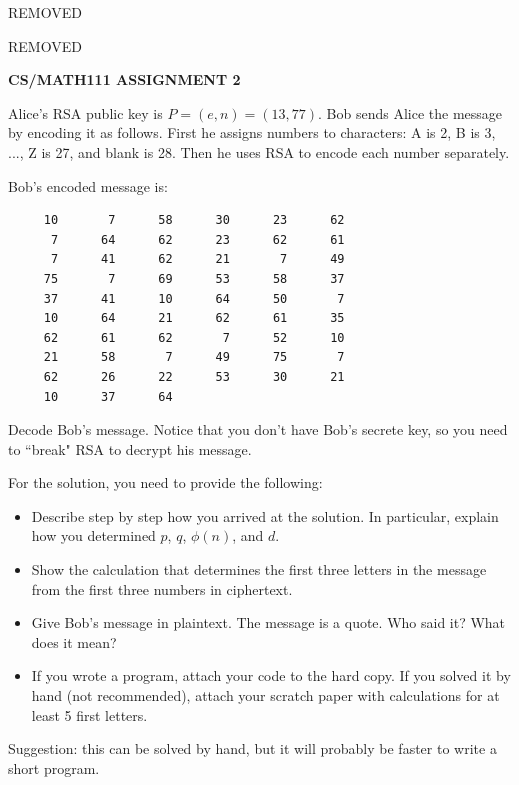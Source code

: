 \documentclass{article}
\begin{document}
\centerline{REMOVED}
\centerline{REMOVED}
\centerline{\large \bf CS/MATH111 ASSIGNMENT 2}


\vskip 0.1in


\vskip 0.2in



\begin{problem}
Alice's RSA public key is $P = (e,n) = (13,77)$.
Bob sends Alice the message by encoding it as follows.
First he assigns numbers to characters:
A is 2, B is 3, ..., Z is 27, and blank is 28. Then he
uses RSA to encode each number separately. 

Bob's encoded message is:

\begin{verbatim}
     10       7      58      30      23      62 
      7      64      62      23      62      61 
      7      41      62      21       7      49 
     75       7      69      53      58      37 
     37      41      10      64      50       7 
     10      64      21      62      61      35 
     62      61      62       7      52      10 
     21      58       7      49      75       7 
     62      26      22      53      30      21 
     10      37      64
\end{verbatim}

Decode Bob's message.
Notice that you don't have Bob's secrete key, so you
need to ``break" RSA to decrypt his message.

\smallskip
For the solution, you need to provide the following:
%
\begin{itemize}
%
\item Describe step by step how you arrived at the solution.
	In particular, explain how you determined $p$, $q$, $\phi(n)$, and $d$.
%
\item Show the calculation that determines the first three letters in the message from the first three numbers in ciphertext.
%
\item Give Bob's message in plaintext. The message is a quote. Who said it? What does it mean?
%
\item If you wrote a program, attach your code to the hard copy.
	If you solved it by hand (not recommended), attach your scratch paper with calculations
	for at least 5 first letters.
%
\end{itemize}

Suggestion: this can be solved by hand, but it will probably
be faster to write a short program.
\end{problem}
\end{document}
